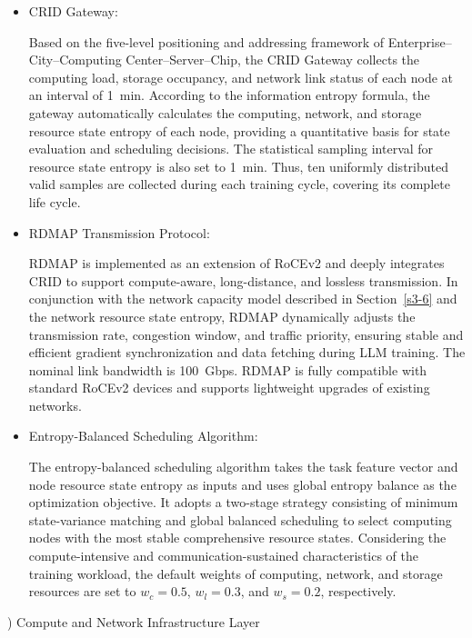 \documentclass{ccjnl}
\begin{document}
\begin{itemize}[nosep]
	
	\item CRID Gateway:
	
	Based on the five-level positioning and addressing framework of Enterprise--City--Computing Center--Server--Chip, the CRID Gateway collects the computing load, storage occupancy, and network link status of each node at an interval of 1~min. According to the information entropy formula, the gateway automatically calculates the computing, network, and storage resource state entropy of each node, providing a quantitative basis for state evaluation and scheduling decisions. The statistical sampling interval for resource state entropy is also set to 1~min. Thus, ten uniformly distributed valid samples are collected during each training cycle, covering its complete life cycle.
	
	\item RDMAP Transmission Protocol:
	
	RDMAP is implemented as an extension of RoCEv2 and deeply integrates CRID to support compute-aware, long-distance, and lossless transmission. In conjunction with the network capacity model described in Section~\ref{s3-6} and the network resource state entropy, RDMAP dynamically adjusts the transmission rate, congestion window, and traffic priority, ensuring stable and efficient gradient synchronization and data fetching during LLM training. The nominal link bandwidth is 100~Gbps. RDMAP is fully compatible with standard RoCEv2 devices and supports lightweight upgrades of existing networks.
	
	\item Entropy-Balanced Scheduling Algorithm:
	
	The entropy-balanced scheduling algorithm takes the task feature vector and node resource state entropy as inputs and uses global entropy balance as the optimization objective. It adopts a two-stage strategy consisting of minimum state-variance matching and global balanced scheduling to select computing nodes with the most stable comprehensive resource states. Considering the compute-intensive and communication-sustained characteristics of the training workload, the default weights of computing, network, and storage resources are set to $w_c=0.5$, $w_l=0.3$, and $w_s=0.2$, respectively.
\end{itemize}

) Compute and Network Infrastructure Layer
\end{document}
